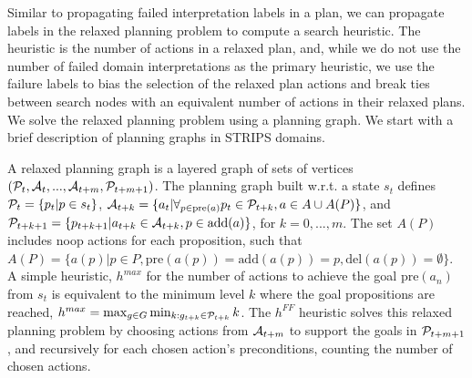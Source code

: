 \documentclass{article}
\def\citep#1{\cite{#1}}
\def\und#1{\noindent{\bf #1}:}
\def\und#1{\medskip{\noindent\bf #1:}}
\begin{document}
Similar to propagating failed interpretation labels in a plan, we can propagate labels in the relaxed planning problem to compute a search heuristic.  The heuristic is the number of actions in a relaxed plan, and, while we do not use the number of failed domain interpretations as the primary heuristic, we use the failure labels to bias the selection of the relaxed plan actions and break ties between search nodes with an equivalent number of actions in their relaxed plans.  We solve the relaxed planning problem using a planning graph.  We start with a brief description of planning graphs in STRIPS domains.

\und{Planning Graph Heuristics}   A relaxed planning graph  is a layered graph of sets of vertices $({\cal P}_t, {\cal A}_t, ..., {\cal A}_{t+m}, {\cal P}_{t+m+1})$.  The planning graph built w.r.t. a state $s_t$ defines ${\cal P}_t = \{p_t | p \in s_t\}$, ${\cal A}_{t+k} = \{ a_t | \forall_{ p \in \text{pre}(a)} p_t \in {\cal P}_{t+k}, a \in A \cup A(P)\}$, and ${\cal P}_{t+k+1} = \{p_{t+k+1} | a_{t+k} \in {\cal A}_{t+k}, p \in \text{add}(a)\}$, for $k = 0, ..., m$.  The set $A(P)$ includes noop actions for each proposition, such that $A(P) = \{a(p) | p \in P, \text{pre}(a(p)) =\text{add}(a(p))=p, \text{del}(a(p))=\emptyset\}$.
A simple heuristic, $h^{max}$ for the number of actions to achieve the goal $\text{pre}(a_{n})$ from $s_t$ is equivalent to the minimum level $k$ where the goal propositions are reached,  $h^{max} =\max_{g \in G} \min_{k: g_{t+k} \in {\cal P}_{t+k}} k$.  The $h^{FF}$  heuristic \citep{hoffmann:nebel:jair-01} solves this relaxed planning problem by choosing actions from ${\cal A}_{t+m}$ to support the goals in ${\cal P}_{t+m+1}$, and recursively for each chosen action's preconditions, counting the number of chosen actions.

\end{document}

